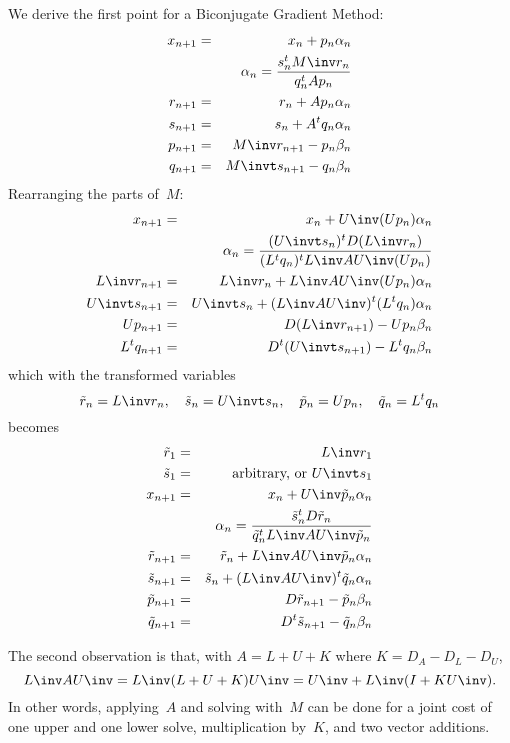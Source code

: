 \documentclass[11pt]{artikel3}
\begin{document}
\begin{Outline}
We derive the first point for a Biconjugate Gradient Method:
\begin{eqnarray*}
    x_{n+1}&=&x_n+p_n\alpha_n\\
        &&\alpha_n={s_n^tM\inv r_n\over q_n^tAp_n}\\
    r_{n+1}&=&r_n+Ap_n\alpha_n\\
    s_{n+1}&=&s_n+A^tq_n\alpha_n\\
    p_{n+1}&=&M\inv r_{n+1}-p_n\beta_n\\
    q_{n+1}&=&M\invt s_{n+1}-q_n\beta_n
\end{eqnarray*}
Rearranging the parts of~$M$:
\begin{eqnarray*}
    x_{n+1}&=&x_n+U\inv(Up_n)\alpha_n\\
        &&\alpha_n={(U\invt s_n)^tD (L\inv r_n)\over
                 (L^tq_n)^tL\inv AU\inv (Up_n)}\\
    L\inv r_{n+1}&=&L\inv r_n+L\inv AU\inv(Up_n)\alpha_n\\
    U\invt s_{n+1}&=&U\invt s_n+(L\inv AU\inv)^t(L^tq_n)\alpha_n\\
    Up_{n+1}&=&D(L\inv r_{n+1})-Up_n\beta_n\\
    L^tq_{n+1}&=&D^t(U\invt s_{n+1})-L^tq_n\beta_n
\end{eqnarray*}
which with the  transformed variables
\[ \tilde r_n=L\inv r_n,\quad \tilde s_n=U\invt s_n,\quad
    \tilde p_n=Up_n,\quad \tilde q_n=L^tq_n \]
becomes
\begin{eqnarray*}
    \tilde r_1&=&L\inv r_1\\
    \tilde s_1&=&\hbox{arbitrary, or $U\invt s_1$}\\
    x_{n+1}&=&x_n+U\inv\tilde p_n\alpha_n\\
        &&\alpha_n={\tilde s_n^tD \tilde r_n\over
                 \tilde q_n^tL\inv AU\inv \tilde p_n}\\
    \tilde r_{n+1}&=&\tilde r_n+L\inv AU\inv\tilde p_n\alpha_n\\
    \tilde s_{n+1}&=&\tilde s_n+(L\inv AU\inv)^t\tilde q_n\alpha_n\\
    \tilde p_{n+1}&=&D\tilde r_{n+1}-\tilde p_n\beta_n\\
    \tilde q_{n+1}&=&D^t\tilde s_{n+1}-\tilde q_n\beta_n
\end{eqnarray*}

The second observation is that, with $A=L+U+K$ where $K=D_A-D_L-D_U$,
\[ L\inv AU\inv = L\inv(L+U+K)U\inv =U\inv +L\inv(I+KU\inv). \]
In other words, applying~$A$ and solving with~$M$ can be done for
a joint cost of one upper and one lower solve, 
multiplication by~$K$, and two vector additions.


\end{Outline}
\end{document}
